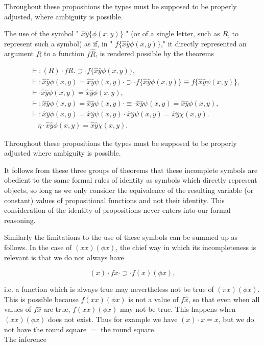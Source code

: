 \documentclass[10pt]{article}
\begin{document}
Throughout these propositions the types must be supposed to be properly adjusted, where ambiguity is possible.

The use of the symbol " $\hat{x} \hat{y}\{\phi(x, y)\}$ " (or of a single letter, such as $R$, to represent such a symbol) as if, in " $f\{\hat{x} \hat{y} \phi(x, y)\}$," it directly represented an argument $R$ to a function $f \hat{R}$, is rendered possible by the theorems

$$
\begin{aligned}
& \vdash:(R) \cdot f R . \supset \cdot f\{\hat{x} \hat{y} \phi(x, y)\}, \\
& \vdash: \hat{x} \hat{y} \phi(x, y)=\hat{x} \hat{y} \psi(x, y) \cdot \supset \cdot f\{\hat{x} \hat{y} \phi(x, y)\} \equiv f\{\hat{x} \hat{y} \psi(x, y)\}, \\
& \vdash \cdot \hat{x} \hat{y} \phi(x, y)=\hat{x} \hat{y} \phi(x, y), \\
& \vdash: \hat{x} \hat{y} \phi(x, y)=\hat{x} \hat{y} \psi(x, y) \cdot \equiv \cdot \hat{x} \hat{y} \psi(x, y)=\hat{x} \hat{y} \phi(x, y), \\
& \vdash: \hat{x} \hat{y} \phi(x, y)=\hat{x} \hat{y} \psi(x, y) \cdot \hat{x} \hat{y} \psi(x, y)=\hat{x} \hat{y} \chi(x, y) . \\
& \quad \eta \cdot \hat{x} \hat{y} \phi(x, y)=\hat{x} \hat{y} \chi(x, y) .
\end{aligned}
$$

Throughout these propositions the types must be supposed to be properly adjusted where ambiguity is possible.

It follows from these three groups of theorems that these incomplete symbols are obedient to the same formal rules of identity as symbols which directly represent objects, so long as we only consider the equivalence of the resulting variable (or constant) values of propositional functions and not their identity. This consideration of the identity of propositions never enters into our formal reasoning.

Similarly the limitations to the use of these symbols can be summed up as follows. In the case of $(x x)(\phi x)$, the chief way in which its incompleteness is relevant is that we do not always have

$$
(x) \cdot f x \cdot \supset \cdot f(x)(\phi x),
$$

i.e. a function which is always true may nevertheless not be true of $(\pi x)(\phi x)$. This is possible because $f(x x)(\phi x)$ is not a value of $f \hat{x}$, so that even when all values of $f \hat{x}$ are true, $f(x x)(\phi x)$ may not be true. This happens when $(x x)(\phi x)$ does not exist. Thus for example we have $(x) \cdot x=x$, but we do not have the round square $=$ the round square.\\
The inference
\end{document}

